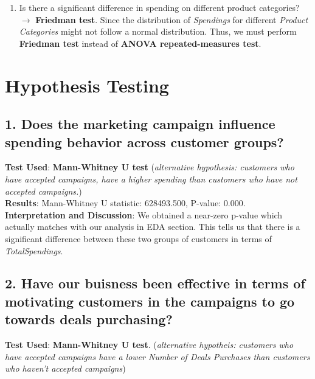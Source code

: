 \documentclass[a4paper,12pt]{article}
\begin{document}
\begin{enumerate}
    \item Is there a significant difference in spending on different product categories? \( \rightarrow \) \textbf{Friedman test}. Since the distribution of \textit{Spendings} for different \textit{Product Categories} might not follow a normal distribution.
    Thus, we must perform \textbf{Friedman test} instead of \textbf{ANOVA repeated-measures test}.
\end{enumerate} 



\section*{Hypothesis Testing}

\subsection*{1. Does the marketing campaign influence spending behavior across customer groups?}
\noindent \textbf{Test Used}: \textbf{Mann-Whitney U test} (\textit{alternative hypothesis: customers who have accepted campaigns, have a higher spending than customers who have not accepted campaigns.})\\ 

\noindent \textbf{Results}: Mann-Whitney U statistic: 628493.500, P-value: 0.000. \\ 

\noindent \textbf{Interpretation and Discussion}: We obtained a near-zero p-value which actually matches with our analysis in EDA section. This tells us that there is a significant difference between these two groups of customers in terms of \textit{TotalSpendings}. \\ 

\subsection*{2. Have our buisness been effective in terms of motivating customers in the campaigns to go towards deals purchasing?}
\noindent \textbf{Test Used}: \textbf{Mann-Whitney U test}. (\textit{alternative hypotheis: customers who have accepted campaigns have a lower \textit{Number of Deals Purchases} than customers who haven't accepted campaigns})\\ 
\end{document}
